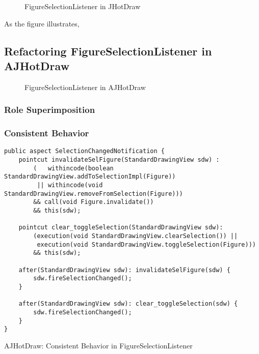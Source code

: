 \begin{figure}[H]
	\centering
  	\caption{FigureSelectionListener in JHotDraw}
  	\label{fig:JHotDraw_FigureSelectionListener_OOP}
\end{figure}

As the figure illustrates, 

\subsection{Refactoring FigureSelectionListener in AJHotDraw}

\begin{figure}[H]
	\centering
  	\caption{FigureSelectionListener in AJHotDraw}
  	\label{fig:JHotDraw_FigureSelectionListener_AOP}
\end{figure}

\subsubsection{Role Superimposition}

\subsubsection{Consistent Behavior}
\begin{sourcecode} [H]
	\begin{lstlisting}[language=AspectJ, escapechar=|]
public aspect SelectionChangedNotification {
	pointcut invalidateSelFigure(StandardDrawingView sdw) :
		(   withincode(boolean StandardDrawingView.addToSelectionImpl(Figure)) 
		 || withincode(void StandardDrawingView.removeFromSelection(Figure)))
		&& call(void Figure.invalidate()) 
		&& this(sdw);

	pointcut clear_toggleSelection(StandardDrawingView sdw):
		(execution(void StandardDrawingView.clearSelection()) ||
		 execution(void StandardDrawingView.toggleSelection(Figure)))
		&& this(sdw);

	after(StandardDrawingView sdw): invalidateSelFigure(sdw) {
		sdw.fireSelectionChanged();
	}

	after(StandardDrawingView sdw): clear_toggleSelection(sdw) {
		sdw.fireSelectionChanged();
	}
}
	\end{lstlisting}
	\caption{AJHotDraw: Consistent Behavior in FigureSelectionListener}
	\label{lst:Consistent Behavior in FigureSelectionListener}
\end{sourcecode}

